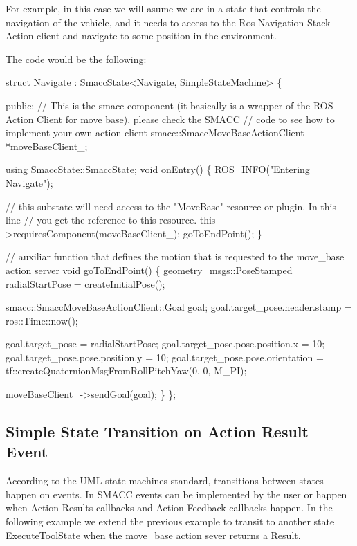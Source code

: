 For example, in this case we will asume we are in a state that controls the navigation of the vehicle, and it needs to access to the Ros Navigation Stack Action client and navigate to some position in the environment.

 

The code would be the following\+:


\begin{DoxyCode}
\textcolor{keyword}{struct }Navigate : \hyperlink{classSmaccState}{SmaccState}<Navigate, SimpleStateMachine> 
\{

\textcolor{keyword}{public}:
  \textcolor{comment}{// This is the smacc component (it basically is a wrapper of the ROS Action Client for move base), please
       check the SMACC}
  \textcolor{comment}{// code to see how to implement your own action client}
  smacc::SmaccMoveBaseActionClient *moveBaseClient\_;

  \textcolor{keyword}{using} SmaccState::SmaccState;
  \textcolor{keywordtype}{void} onEntry()
  \{
    ROS\_INFO(\textcolor{stringliteral}{"Entering Navigate"});

    \textcolor{comment}{// this substate will need access to the "MoveBase" resource or plugin. In this line}
    \textcolor{comment}{// you get the reference to this resource.}
    this->requiresComponent(moveBaseClient\_);
    goToEndPoint();
  \}

  \textcolor{comment}{// auxiliar function that defines the motion that is requested to the move\_base action server}
  \textcolor{keywordtype}{void} goToEndPoint() \{
    geometry\_msgs::PoseStamped radialStartPose = createInitialPose();

    smacc::SmaccMoveBaseActionClient::Goal goal;
    goal.target\_pose.header.stamp = ros::Time::now();

    goal.target\_pose = radialStartPose;
    goal.target\_pose.pose.position.x = 10;
    goal.target\_pose.pose.position.y = 10;
    goal.target\_pose.pose.orientation =
        tf::createQuaternionMsgFromRollPitchYaw(0, 0, M\_PI);

    moveBaseClient\_->sendGoal(goal);
  \}
\};
\end{DoxyCode}


\subsection*{Simple State Transition on Action Result Event}

According to the U\+ML state machines standard, transitions between states happen on events. In S\+M\+A\+CC events can be implemented by the user or happen when Action Results callbacks and Action Feedback callbacks happen. In the following example we extend the previous example to transit to another state \textquotesingle{}Execute\+Tool\+State\textquotesingle{} when the move\+\_\+base action sever returns a Result.

